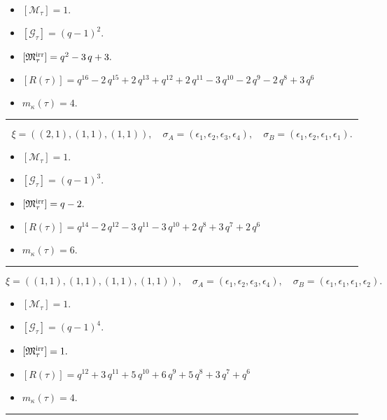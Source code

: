 \documentclass[10pt,a4paper]{amsart}
\begin{document}
\begin{itemize}
 \item $[\mathcal{M}_{\tau}] = 1 .$

 \item $[\mathcal{G}_{\tau}] = {\left(q - 1\right)}^{2} .$

 \item $[{\frak M}_{\tau}^{\textrm{irr}}] = q^{2} - 3 \, q + 3 .$

 \item $[R(\tau)] = q^{16} - 2 \, q^{15} + 2 \, q^{13} + q^{12} + 2 \, q^{11} - 3 \, q^{10} - 2 \, q^{9} - 2 \, q^{8} + 3 \, q^{6} $

 \item $m_{\kappa}(\tau) = 4 .$

 \end{itemize}
\noindent\rule{8cm}{0.4pt}

$$\xi = ({(2, 1), (1, 1), (1, 1)}),\quad \sigma_A = ({{\epsilon_1, \epsilon_2}, {\epsilon_3}, {\epsilon_4}}),\quad \sigma_B = ({{\epsilon_1, \epsilon_2}, {\epsilon_1}, {\epsilon_1}}).$$

\begin{itemize}
 \item $[\mathcal{M}_{\tau}] = 1 .$

 \item $[\mathcal{G}_{\tau}] = {\left(q - 1\right)}^{3} .$

 \item $[{\frak M}_{\tau}^{\textrm{irr}}] = q - 2 .$

 \item $[R(\tau)] = q^{14} - 2 \, q^{12} - 3 \, q^{11} - 3 \, q^{10} + 2 \, q^{8} + 3 \, q^{7} + 2 \, q^{6} $

 \item $m_{\kappa}(\tau) = 6 .$

 \end{itemize}
\noindent\rule{8cm}{0.4pt}

$$\xi = ({(1, 1), (1, 1), (1, 1), (1, 1)}),\quad \sigma_A = ({{\epsilon_1}, {\epsilon_2}, {\epsilon_3}, {\epsilon_4}}),\quad \sigma_B = ({{\epsilon_1}, {\epsilon_1}, {\epsilon_1}, {\epsilon_2}}).$$

\begin{itemize}
 \item $[\mathcal{M}_{\tau}] = 1 .$

 \item $[\mathcal{G}_{\tau}] = {\left(q - 1\right)}^{4} .$

 \item $[{\frak M}_{\tau}^{\textrm{irr}}] = 1 .$

 \item $[R(\tau)] = q^{12} + 3 \, q^{11} + 5 \, q^{10} + 6 \, q^{9} + 5 \, q^{8} + 3 \, q^{7} + q^{6} $

 \item $m_{\kappa}(\tau) = 4 .$

 \end{itemize}
\noindent\rule{8cm}{0.4pt}
\end{document}
